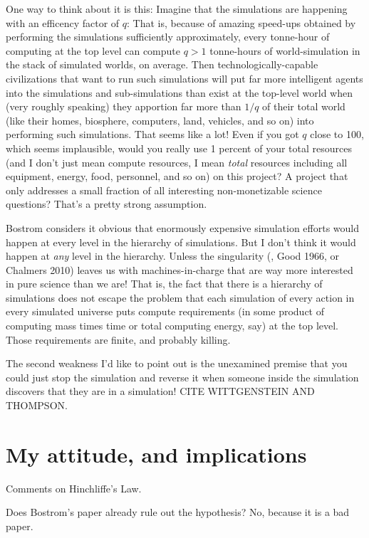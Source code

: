 One way to think about it is this: Imagine that the simulations are
happening with an efficency factor of $q$: That is, because of amazing
speed-ups obtained by performing the simulations sufficiently
approximately, every tonne-hour of computing at the top level can
compute $q>1$ tonne-hours of world-simulation in the stack of
simulated worlds, on average. Then technologically-capable
civilizations that want to run such simulations will put far more
intelligent agents into the simulations and sub-simulations than exist
at the top-level world when (very roughly speaking) they apportion far
more than $1/q$ of their total world (like their homes, biosphere,
computers, land, vehicles, and so on) into performing such
simulations. That seems like a lot! Even if you got $q$ close to 100,
which seems implausible, would you really use 1 percent of your total
resources (and I don't just mean compute resources, I mean
\emph{total} resources including all equipment, energy, food,
personnel, and so on) on this project? A project that only addresses a
small fraction of all interesting non-monetizable science questions?
That's a pretty strong assumption.

Bostrom considers it obvious that enormously expensive simulation
efforts would happen at every level in the hierarchy of
simulations. But I don't think it would happen at \emph{any} level in
the hierarchy. Unless the singularity (\eg, Good 1966, or Chalmers 2010) leaves us with
machines-in-charge that are way more interested in pure science than
we are! That is, the fact that there is a hierarchy of simulations
does not escape the problem that each simulation of every action in
every simulated universe puts compute requirements (in some product of
computing mass times time or total computing energy, say) at the top
level. Those requirements are finite, and probably killing.

The second weakness I'd like to point out is the unexamined premise
that you could just stop the simulation and reverse it when someone
inside the simulation discovers that they are in a simulation! CITE
WITTGENSTEIN AND THOMPSON.

\section{My attitude, and implications}

Comments on Hinchliffe's Law.

Does Bostrom's paper already rule out the hypothesis? No, because it
is a bad paper.

